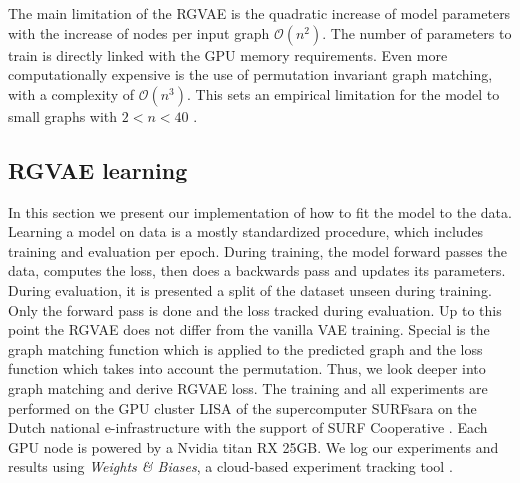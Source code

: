 The main limitation of the RGVAE is the quadratic increase of model parameters with the increase of nodes per input graph $\mathcal{O}(n^2)$. The number of parameters to train is directly linked with the GPU memory requirements. Even more computationally expensive is the use of permutation invariant graph matching, with a complexity of $\mathcal{O}(n^3)$. This sets an empirical limitation for the model to small graphs with $2<n<40$ \cite{simonovsky_graphvae_2018}.






\subsection{RGVAE learning}

In this section we present our implementation of how to fit the model to the data. Learning a model on data is a mostly standardized procedure, which includes training and evaluation per epoch. During training, the model forward passes the data, computes the loss, then does a backwards pass and updates its parameters. During evaluation, it is presented a split of the dataset unseen during training. Only the forward pass is done and the loss tracked during evaluation. Up to this point the RGVAE does not differ from the vanilla VAE training. Special is the graph matching function which is applied to the predicted graph and the loss function which takes into account the permutation. Thus, we look deeper into graph matching and derive RGVAE loss.
The training and all experiments are performed on the GPU cluster LISA of the supercomputer SURFsara on the Dutch national e-infrastructure with the support of SURF Cooperative \cite{fengvaleriu}. Each GPU node is powered by a Nvidia titan RX 25GB. We log our experiments and results using \textit{Weights & Biases}, a cloud-based experiment tracking tool \cite{wandb}.



